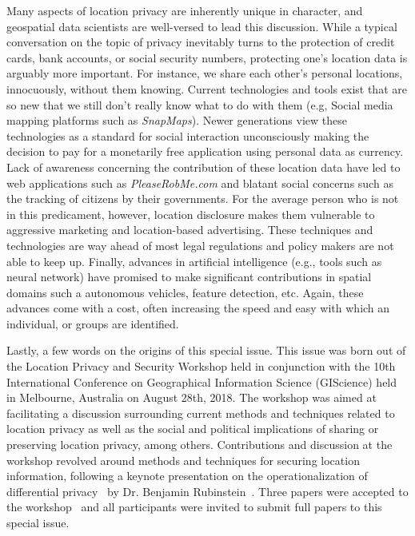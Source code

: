 \documentclass{josised}
\begin{document}
Many aspects of location privacy are inherently unique in character, and geospatial data scientists are well-versed to lead this discussion. While a typical conversation on the topic of privacy inevitably turns to the protection of credit cards, bank accounts, or social security numbers, protecting one’s location data is arguably more important.  For instance, we share each other’s personal locations, innocuously, without them knowing.  Current technologies and tools exist that are so new that we still don’t really know what to do with them (e.g, Social media mapping platforms such as \textit{SnapMaps}).  Newer generations view these technologies as a standard for social interaction unconsciously making the decision to pay for a monetarily free application using personal data as currency.  Lack of awareness concerning the contribution of these location data have led to web applications such as \textit{PleaseRobMe.com} and blatant social concerns such as the tracking of citizens by their governments.  For the average person who is not in this predicament, however, location disclosure makes them vulnerable to aggressive marketing and location-based advertising. These techniques and technologies are way ahead of most legal regulations and policy makers are not able to keep up.  Finally, advances in artificial intelligence (e.g., tools such as neural network) have promised to make significant contributions in spatial domains such a autonomous vehicles, feature detection, etc.  Again, these advances come with a cost,  often increasing the speed and easy with which an individual, or groups are identified.

Lastly, a few words on the origins of this special issue.  This issue was born out of the Location Privacy and Security Workshop held in conjunction with the 10th International Conference on Geographical Information Science (GIScience) held in Melbourne, Australia on August 28th, 2018.  The workshop was aimed at facilitating a discussion surrounding current methods and techniques related to location privacy as well as the social and political implications of sharing or preserving location privacy, among others. Contributions and discussion at the workshop revolved around methods and techniques for securing location information, following a keynote presentation on the operationalization of differential privacy~\cite{dwork2011differential} by Dr. Benjamin Rubinstein~\cite{rubinstein2017diffpriv}.   Three papers were accepted to the workshop~\cite{naghizadeseeking,gao2018,liu2018} and all participants were invited to submit full papers to this special issue.
\end{document}

